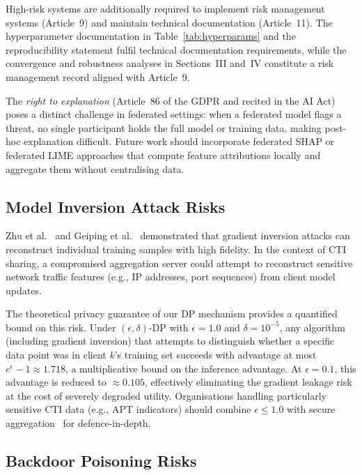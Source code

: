 \documentclass[conference]{IEEEtran}
\begin{document}
High-risk systems are additionally required to implement risk management
systems (Article~9) and maintain technical documentation (Article~11).
The hyperparameter documentation in Table~\ref{tab:hyperparams}
and the reproducibility statement fulfil technical documentation
requirements, while the convergence and robustness analyses in
Sections~III and~IV constitute a risk management record aligned with
Article~9.

The \emph{right to explanation} (Article~86 of the GDPR and
recited in the AI Act) poses a distinct challenge in federated
settings: when a federated model flags a threat, no single participant
holds the full model or training data, making post-hoc explanation
difficult.
Future work should incorporate federated SHAP or federated LIME
approaches that compute feature attributions locally and aggregate them
without centralising data.

\subsection{Model Inversion Attack Risks}

Zhu et al.~\cite{zhu2019} and Geiping et al.~\cite{geiping2020}
demonstrated that gradient inversion attacks can reconstruct individual
training samples with high fidelity.
In the context of CTI sharing, a compromised aggregation server could
attempt to reconstruct sensitive network traffic features (e.g., IP
addresses, port sequences) from client model updates.

The theoretical privacy guarantee of our DP mechanism provides
a quantified bound on this risk.
Under $(\epsilon,\delta)$-DP with $\epsilon=1.0$ and $\delta=10^{-5}$,
any algorithm (including gradient inversion) that attempts to
distinguish whether a specific data point was in client $k$'s
training set succeeds with advantage at most $e^\epsilon - 1
\approx 1.718$, a multiplicative bound on the inference advantage.
At $\epsilon=0.1$, this advantage is reduced to $\approx 0.105$,
effectively eliminating the gradient leakage risk at the cost of
severely degraded utility.
Organisations handling particularly sensitive CTI data (e.g., APT
indicators) should combine $\epsilon \leq 1.0$ with secure
aggregation~\cite{bonawitz2017} for defence-in-depth.

\subsection{Backdoor Poisoning Risks}
\end{document}

